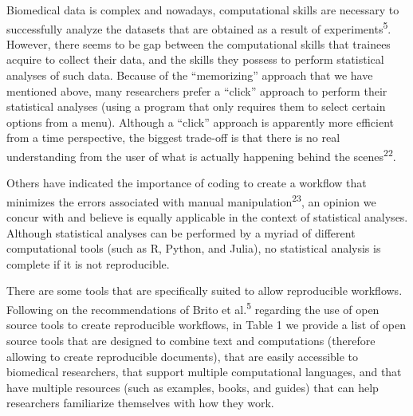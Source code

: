 \documentclass[smallextended]{svjour3}       %
\begin{document}
Biomedical data is complex and nowadays, computational skills are
necessary to successfully analyze the datasets that are obtained as a
result of experiments\textsuperscript{5}. However, there seems to be gap
between the computational skills that trainees acquire to collect their
data, and the skills they possess to perform statistical analyses of
such data. Because of the ``memorizing'' approach that we have mentioned
above, many researchers prefer a ``click'' approach to perform their
statistical analyses (using a program that only requires them to select
certain options from a menu). Although a ``click'' approach is
apparently more efficient from a time perspective, the biggest trade-off
is that there is no real understanding from the user of what is actually
happening behind the scenes\textsuperscript{22}.

Others have indicated the importance of coding to create a workflow that
minimizes the errors associated with manual
manipulation\textsuperscript{23}, an opinion we concur with and believe
is equally applicable in the context of statistical analyses. Although
statistical analyses can be performed by a myriad of different
computational tools (such as R, Python, and Julia), no statistical
analysis is complete if it is not reproducible.

There are some tools that are specifically suited to allow reproducible
workflows. Following on the recommendations of Brito et
al.\textsuperscript{5} regarding the use of open source tools to create
reproducible workflows, in Table 1 we provide a list of open source
tools that are designed to combine text and computations (therefore
allowing to create reproducible documents), that are easily accessible
to biomedical researchers, that support multiple computational
languages, and that have multiple resources (such as examples, books,
and guides) that can help researchers familiarize themselves with how
they work.

\footnotesize
\end{document}
